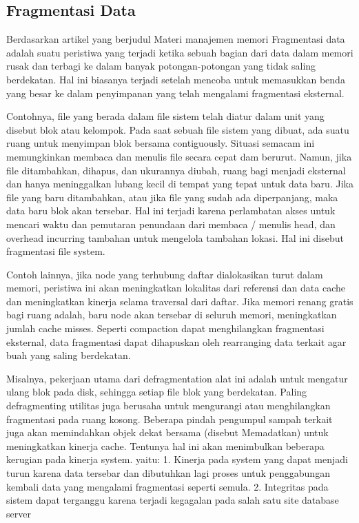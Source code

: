 \subsection{Fragmentasi Data}
Berdasarkan artikel yang berjudul Materi manajemen memori \cite{tawarmateri} Fragmentasi data adalah suatu peristiwa  yang terjadi ketika sebuah bagian dari data dalam memori rusak dan terbagi ke dalam banyak potongan-potongan yang tidak saling berdekatan. Hal ini biasanya terjadi setelah mencoba untuk memasukkan benda yang besar ke dalam penyimpanan yang telah mengalami fragmentasi eksternal.
    
Contohnya, file yang berada dalam file sistem telah diatur dalam unit yang disebut blok atau kelompok. Pada saat sebuah file sistem yang dibuat, ada suatu ruang untuk menyimpan blok bersama contiguously. Situasi semacam ini memungkinkan membaca dan menulis file secara cepat dam berurut. Namun, jika file ditambahkan, dihapus, dan ukurannya diubah, ruang bagi menjadi eksternal dan hanya meninggalkan lubang kecil di tempat yang tepat untuk data baru. Jika file yang baru ditambahkan, atau jika file yang sudah ada diperpanjang, maka data baru blok akan tersebar. Hal ini terjadi karena perlambatan akses untuk mencari waktu dan pemutaran penundaan dari membaca / menulis head, dan overhead incurring tambahan untuk mengelola tambahan lokasi. Hal ini disebut fragmentasi file system.

Contoh lainnya, jika node yang terhubung daftar dialokasikan turut dalam memori, peristiwa ini akan meningkatkan lokalitas dari referensi dan data cache dan meningkatkan kinerja selama traversal dari daftar. Jika memori renang gratis bagi ruang adalah, baru node akan tersebar di seluruh memori, meningkatkan jumlah cache misses.
Seperti compaction dapat menghilangkan fragmentasi eksternal, data fragmentasi dapat dihapuskan oleh rearranging data terkait agar buah yang saling berdekatan. 

Misalnya, pekerjaan utama dari defragmentation alat ini adalah untuk mengatur ulang blok pada disk, sehingga setiap file blok yang berdekatan. Paling defragmenting utilitas juga berusaha untuk mengurangi atau menghilangkan fragmentasi pada ruang kosong. Beberapa pindah pengumpul sampah terkait juga akan memindahkan objek dekat bersama (disebut Memadatkan) untuk meningkatkan kinerja cache. Tentunya hal ini akan menimbulkan beberapa  kerugian  pada kinerja system. yaitu:
1.	 Kinerja pada system  yang dapat menjadi turun karena data tersebar dan dibutuhkan lagi proses untuk penggabungan kembali data yang mengalami fragmentasi seperti semula. 
2.	Integritas pada sistem  dapat terganggu karena  terjadi kegagalan pada salah satu site database server

